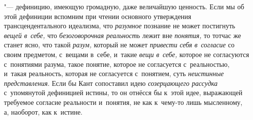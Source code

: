 "--- дефиницию, имеющую громадную, даже величайшую ценность.
Если мы об этой дефиниции вспомним при чтении основного утверждения
трансцендентального идеализма, что
{\em разумное} познание
не может постигнуть {\em вещей в~себе,}
что {\em безоговорочная
реальность} лежит вне
{\em понятия,} то тотчас
же станет ясно, что такой {\em разум,}
который не может
{\em привести себя в~согласие}
со своим предметом, с~вещами в~себе, и~такие
{\em вещи в~себе,}
которое не согласуются с~понятиями разума, такое понятие,
которое не согласуется с~реальностью, и~такая реальность, которая не
согласуется с~понятием, суть
{\em неистинные представления}.
Если бы Кант сопоставил идею
{\em созерцающего рассудка}
с~упомянутой дефиницией истины, то он отнёсся бы к~этой идее,
выражающей требуемое согласие реальности и~понятия, не как к~чему-то лишь
мысленному, а, наоборот, как к~истине.

